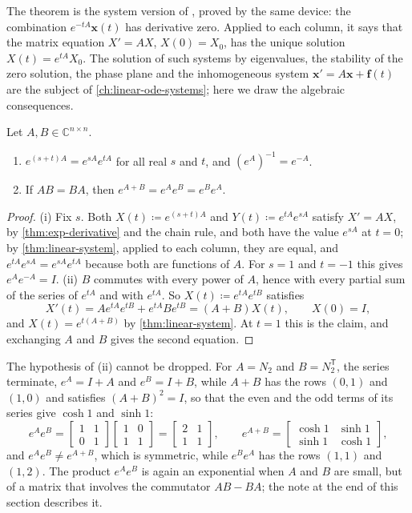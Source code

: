 The theorem is the system version of , proved by the same device: the combination $e^{-tA}\mathbf x(t)$ has derivative zero. Applied to each column, it says that the matrix equation $X'=AX$, $X(0)=X_0$, has the unique solution $X(t)=e^{tA}X_0$. The solution of such systems by eigenvalues, the stability of the zero solution, the phase plane and the inhomogeneous system $\mathbf x'=A\mathbf x+\mathbf f(t)$ are the subject of \cref{ch:linear-ode-systems}; here we draw the algebraic consequences.


\begin{corollary}
\label{cor:exp-laws}
Let $A,B\in\mathbb C^{n\times n}$.
\begin{enumerate}
\item $e^{(s+t)A}=e^{sA}e^{tA}$ for all real $s$ and $t$, and $(e^A)^{-1}=e^{-A}$.
\item If $AB=BA$, then $e^{A+B}=e^Ae^B=e^Be^A$.
\end{enumerate}
\end{corollary}

\begin{proof}
(i) Fix $s$. Both $X(t)\coloneqq e^{(s+t)A}$ and $Y(t)\coloneqq e^{tA}e^{sA}$ satisfy $X'=AX$, by \cref{thm:exp-derivative} and the chain rule, and both have the value $e^{sA}$ at $t=0$; by \cref{thm:linear-system}, applied to each column, they are equal, and $e^{tA}e^{sA}=e^{sA}e^{tA}$ because both are functions of $A$. For $s=1$ and $t=-1$ this gives $e^Ae^{-A}=I$. (ii) $B$ commutes with every power of $A$, hence with every partial sum of the series of $e^{tA}$ and with $e^{tA}$. So $X(t)\coloneqq e^{tA}e^{tB}$ satisfies
\[
X'(t)=Ae^{tA}e^{tB}+e^{tA}Be^{tB}=(A+B)X(t),\qquad X(0)=I ,
\]
and $X(t)=e^{t(A+B)}$ by \cref{thm:linear-system}. At $t=1$ this is the claim, and exchanging $A$ and $B$ gives the second equation.
\end{proof}

The hypothesis of (ii) cannot be dropped. For $A=N_2$ and $B=N_2^{\mathsf T}$, the series terminate, $e^A=I+A$ and $e^B=I+B$, while $A+B$ has the rows $(0,1)$ and $(1,0)$ and satisfies $(A+B)^2=I$, so that the even and the odd terms of its series give $\cosh1$ and $\sinh1$:
\[
e^Ae^B=\begin{bmatrix}1&1\\0&1\end{bmatrix}\begin{bmatrix}1&0\\1&1\end{bmatrix}=\begin{bmatrix}2&1\\1&1\end{bmatrix},\qquad e^{A+B}=\begin{bmatrix}\cosh1&\sinh1\\\sinh1&\cosh1\end{bmatrix},
\]
and $e^Ae^B\ne e^{A+B}$, which is symmetric, while $e^Be^A$ has the rows $(1,1)$ and $(1,2)$. The product $e^Ae^B$ is again an exponential when $A$ and $B$ are small, but of a matrix that involves the commutator $AB-BA$; the note at the end of this section describes it.

